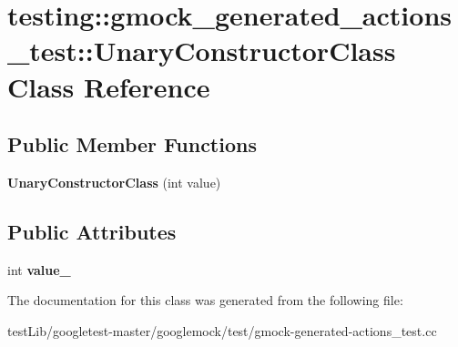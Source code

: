 \hypertarget{classtesting_1_1gmock__generated__actions__test_1_1UnaryConstructorClass}{}\section{testing\+:\+:gmock\+\_\+generated\+\_\+actions\+\_\+test\+:\+:Unary\+Constructor\+Class Class Reference}
\label{classtesting_1_1gmock__generated__actions__test_1_1UnaryConstructorClass}
\subsection*{Public Member Functions}
\begin{DoxyCompactItemize}
\item 
\mbox{\label{classtesting_1_1gmock__generated__actions__test_1_1UnaryConstructorClass_a35b2c0aab3928c1d558c11b6652a7262}} 
{\bfseries Unary\+Constructor\+Class} (int value)
\end{DoxyCompactItemize}
\subsection*{Public Attributes}
\begin{DoxyCompactItemize}
\item 
\mbox{\label{classtesting_1_1gmock__generated__actions__test_1_1UnaryConstructorClass_a5e96ce337c5eb7016eba2ea66ae46851}} 
int {\bfseries value\+\_\+}
\end{DoxyCompactItemize}


The documentation for this class was generated from the following file\+:\begin{DoxyCompactItemize}
\item 
test\+Lib/googletest-\/master/googlemock/test/gmock-\/generated-\/actions\+\_\+test.\+cc\end{DoxyCompactItemize}
